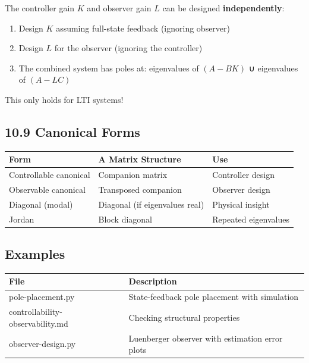 \documentclass[11pt,a4paper]{book}
\begin{document}
The controller gain $K$ and observer gain $L$ can be designed \textbf{independently}:

\begin{enumerate}
\item Design $K$ assuming full-state feedback (ignoring observer)
\item Design $L$ for the observer (ignoring the controller)
\item The combined system has poles at: eigenvalues of $(A-BK)$ ∪ eigenvalues of $(A-LC)$
\end{enumerate}

This only holds for LTI systems!

\medskip\noindent\hrulefill\medskip

\subsection{10.9 Canonical Forms}

\begin{center}
\begin{tabular}{|l|l|l|}
\hline
Form & A Matrix Structure & Use \\
\hline
Controllable canonical & Companion matrix & Controller design \\
Observable canonical & Transposed companion & Observer design \\
Diagonal (modal) & Diagonal (if eigenvalues real) & Physical insight \\
Jordan & Block diagonal & Repeated eigenvalues \\
\hline
\end{tabular}
\end{center}

\medskip\noindent\hrulefill\medskip

\subsection{Examples}

\begin{center}
\begin{tabular}{|l|l|}
\hline
File & Description \\
\hline
pole-placement.py & State-feedback pole placement with simulation \\
controllability-observability.md & Checking structural properties \\
observer-design.py & Luenberger observer with estimation error plots \\
\hline
\end{tabular}
\end{center}
\end{document}
